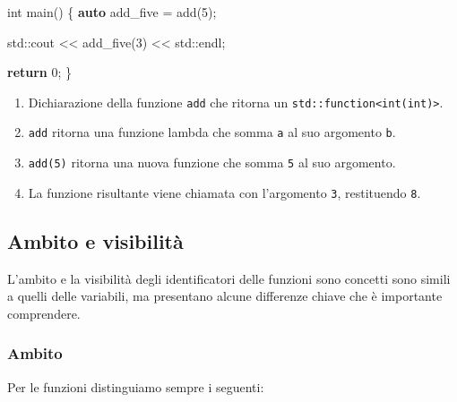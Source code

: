 \documentclass[
  letterpaper,
]{scrbook}
\newenvironment{Shaded}{\begin{snugshade}}{\end{snugshade}}
\newcommand{\BuiltInTok}[1]{\textcolor[rgb]{0.00,0.23,0.31}{#1}}
\newcommand{\ControlFlowTok}[1]{\textcolor[rgb]{0.00,0.23,0.31}{\textbf{#1}}}
\newcommand{\DataTypeTok}[1]{\textcolor[rgb]{0.68,0.00,0.00}{#1}}
\newcommand{\DecValTok}[1]{\textcolor[rgb]{0.68,0.00,0.00}{#1}}
\newcommand{\KeywordTok}[1]{\textcolor[rgb]{0.00,0.23,0.31}{\textbf{#1}}}
\newcommand{\NormalTok}[1]{\textcolor[rgb]{0.00,0.23,0.31}{#1}}
\newcommand{\OperatorTok}[1]{\textcolor[rgb]{0.37,0.37,0.37}{#1}}
\providecommand{\tightlist}{%
  \setlength{\itemsep}{0pt}\setlength{\parskip}{0pt}}\usepackage{longtable,booktabs,array}
\newcommand*\circled[1]{\tikz[baseline=(char.base)]{
          \node[shape=circle,draw,inner sep=1pt] (char) {{\scriptsize#1}};}}
\begin{document}
\begin{itemize}
\begin{Shaded}
\begin{Highlighting}[]
\DataTypeTok{int}\NormalTok{ main}\OperatorTok{()} \OperatorTok{\{}
  \KeywordTok{auto}\NormalTok{ add\_five }\OperatorTok{=}\NormalTok{ add}\OperatorTok{(}\DecValTok{5}\OperatorTok{);} \hspace*{\fill}\NormalTok{\circled{3}}

  \BuiltInTok{std::}\NormalTok{cout }\OperatorTok{\textless{}\textless{}}\NormalTok{ add\_five}\OperatorTok{(}\DecValTok{3}\OperatorTok{)} \OperatorTok{\textless{}\textless{}} \BuiltInTok{std::}\NormalTok{endl}\OperatorTok{;} \hspace*{\fill}\NormalTok{\circled{4}}

  \ControlFlowTok{return} \DecValTok{0}\OperatorTok{;}
\OperatorTok{\}}
\end{Highlighting}
\end{Shaded}
\end{itemize}

\begin{enumerate}
\def\labelenumi{\arabic{enumi}.}
\tightlist
\item
  Dichiarazione della funzione \texttt{add} che ritorna un
  \texttt{std::function\textless{}int(int)\textgreater{}}.
\item
  \texttt{add} ritorna una funzione lambda che somma \texttt{a} al suo
  argomento \texttt{b}.
\item
  \texttt{add(5)} ritorna una nuova funzione che somma \texttt{5} al suo
  argomento.
\item
  La funzione risultante viene chiamata con l'argomento \texttt{3},
  restituendo \texttt{8}.
\end{enumerate}

\subsection{Ambito e visibilità}\label{ambito-e-visibilituxe0}

L'ambito e la visibilità degli identificatori delle funzioni sono
concetti sono simili a quelli delle variabili, ma presentano alcune
differenze chiave che è importante comprendere.

\subsubsection{Ambito}\label{ambito}

Per le funzioni distinguiamo sempre i seguenti:
\end{document}
